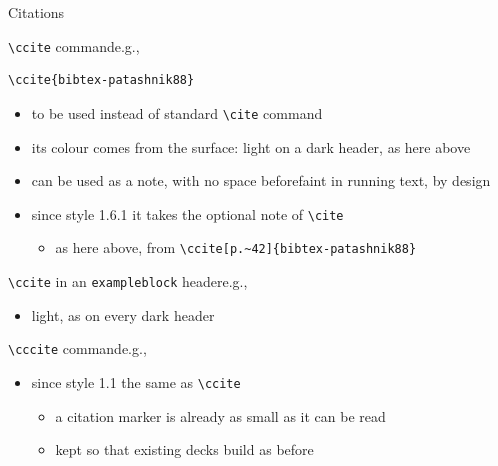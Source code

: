 \begin{frame}{Citations}
%
\begin{block}{\texttt{\textbackslash{}ccite} command\textemdash{}e.g., }
\begin{verbatim}
\ccite{bibtex-patashnik88}
\end{verbatim}
\begin{itemize}
	\item to be used instead of standard \texttt{\textbackslash{}cite} command
	\item its colour comes from the surface: light on a dark header, as here above
	\item can be used as a note, with no space before\textemdash{}faint in running text, by design
	\item since style 1.6.1 it takes the optional note of \texttt{\textbackslash{}cite}
	\begin{itemize}
		\item as here above, from \verb|\ccite[p.~42]{bibtex-patashnik88}|
	\end{itemize}
\end{itemize}
\end{block}
%
\begin{exampleblock}{\texttt{\textbackslash{}ccite} in an \texttt{exampleblock} header\textemdash{}e.g., }
\begin{itemize}
	\item light, as on every dark header
\end{itemize}
\end{exampleblock}
%
\begin{alertblock}{\texttt{\textbackslash{}cccite} command\textemdash{}e.g., }
\begin{itemize}
	\item since style 1.1 the same as \texttt{\textbackslash{}ccite}
	\begin{itemize}
		\item a citation marker is already as small as it can be read
		\item kept so that existing decks build as before
	\end{itemize}
\end{itemize}
\end{alertblock}
%
\end{frame}
